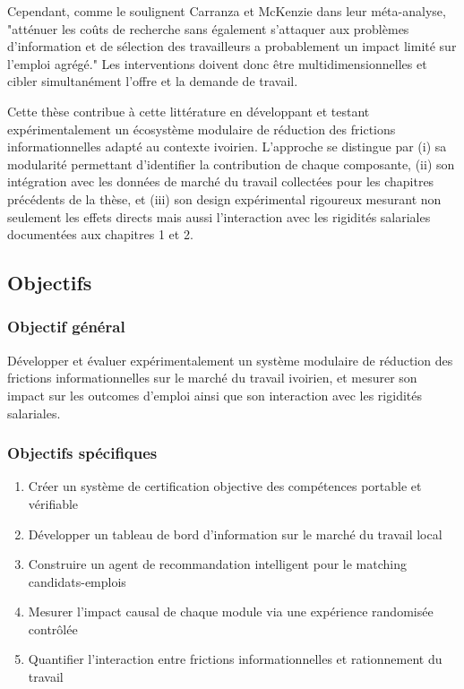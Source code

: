 \documentclass[12pt]{article}
\begin{document}
Cependant, comme le soulignent Carranza et McKenzie \citeyearpar{carranza2024} dans leur méta-analyse, "atténuer les coûts de recherche sans également s'attaquer aux problèmes d'information et de sélection des travailleurs a probablement un impact limité sur l'emploi agrégé." Les interventions doivent donc être multidimensionnelles et cibler simultanément l'offre et la demande de travail.

Cette thèse contribue à cette littérature en développant et testant expérimentalement un écosystème modulaire de réduction des frictions informationnelles adapté au contexte ivoirien. L'approche se distingue par (i) sa modularité permettant d'identifier la contribution de chaque composante, (ii) son intégration avec les données de marché du travail collectées pour les chapitres précédents de la thèse, et (iii) son design expérimental rigoureux mesurant non seulement les effets directs mais aussi l'interaction avec les rigidités salariales documentées aux chapitres 1 et 2.

\subsection{Objectifs}

\subsubsection{Objectif général}

Développer et évaluer expérimentalement un système modulaire de réduction des frictions informationnelles sur le marché du travail ivoirien, et mesurer son impact sur les outcomes d'emploi ainsi que son interaction avec les rigidités salariales.

\subsubsection{Objectifs spécifiques}

\begin{enumerate}
    \item Créer un système de certification objective des compétences portable et vérifiable
    \item Développer un tableau de bord d'information sur le marché du travail local
    \item Construire un agent de recommandation intelligent pour le matching candidats-emplois
    \item Mesurer l'impact causal de chaque module via une expérience randomisée contrôlée
    \item Quantifier l'interaction entre frictions informationnelles et rationnement du travail
\end{enumerate}
\end{document}
